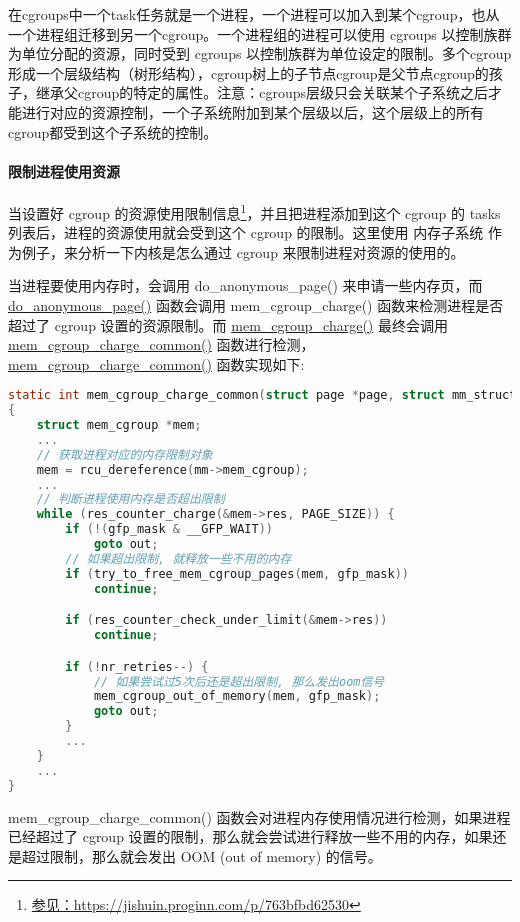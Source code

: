 \documentclass[../../../interview-questions.tex]{subfiles}
\begin{document}
在cgroups中一个task任务就是一个进程，一个进程可以加入到某个cgroup，也从一个进程组迁移到另一个cgroup。一个进程组的进程可以使用 cgroups 以控制族群为单位分配的资源，同时受到 cgroups 以控制族群为单位设定的限制。多个cgroup形成一个层级结构（树形结构），cgroup树上的子节点cgroup是父节点cgroup的孩子，继承父cgroup的特定的属性。注意：cgroups层级只会关联某个子系统之后才能进行对应的资源控制，一个子系统附加到某个层级以后，这个层级上的所有cgroup都受到这个子系统的控制。

\paragraph{限制进程使用资源}

当设置好 cgroup 的资源使用限制信息\footnote{\url{参见：https://jishuin.proginn.com/p/763bfbd62530}}，并且把进程添加到这个 cgroup 的 tasks 列表后，进程的资源使用就会受到这个 cgroup 的限制。这里使用 内存子系统 作为例子，来分析一下内核是怎么通过 cgroup 来限制进程对资源的使用的。

当进程要使用内存时，会调用 do\_anonymous\_page() 来申请一些内存页，而 \url{do\_anonymous\_page()} 函数会调用 mem\_cgroup\_charge() 函数来检测进程是否超过了 cgroup 设置的资源限制。而 \url{mem\_cgroup\_charge()} 最终会调用 \url{mem\_cgroup\_charge\_common()} 函数进行检测，\url{mem\_cgroup\_charge\_common()} 函数实现如下:

\begin{lstlisting}[language=C]
static int mem_cgroup_charge_common(struct page *page, struct mm_struct *mm, gfp_t gfp_mask, enum charge_type ctype)
{
    struct mem_cgroup *mem;
    ...
    // 获取进程对应的内存限制对象
    mem = rcu_dereference(mm->mem_cgroup); 
    ...
    // 判断进程使用内存是否超出限制
    while (res_counter_charge(&mem->res, PAGE_SIZE)) { 
        if (!(gfp_mask & __GFP_WAIT))
            goto out;
        // 如果超出限制, 就释放一些不用的内存
        if (try_to_free_mem_cgroup_pages(mem, gfp_mask)) 
            continue;

        if (res_counter_check_under_limit(&mem->res))
            continue;

        if (!nr_retries--) {
            // 如果尝试过5次后还是超出限制, 那么发出oom信号
            mem_cgroup_out_of_memory(mem, gfp_mask); 
            goto out;
        }
        ...
    }
    ...
}
\end{lstlisting}

mem\_cgroup\_charge\_common() 函数会对进程内存使用情况进行检测，如果进程已经超过了 cgroup 设置的限制，那么就会尝试进行释放一些不用的内存，如果还是超过限制，那么就会发出 OOM (out of memory) 的信号。
\end{document}
